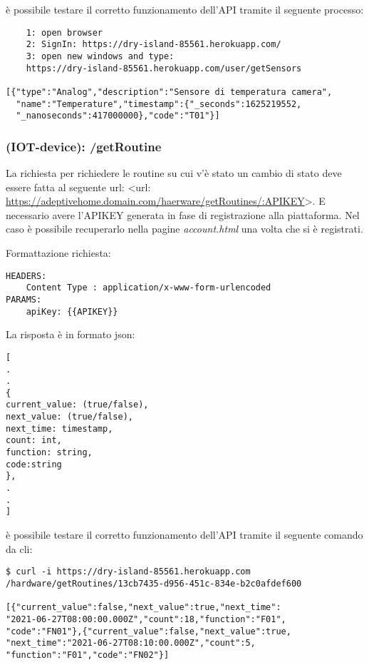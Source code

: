 \documentclass[onecolumn,a4paper]{article}
\begin{document}
è possibile testare il corretto funzionamento dell'API tramite il seguente processo:

\begin{verbatim}
    1: open browser
    2: SignIn: https://dry-island-85561.herokuapp.com/
    3: open new windows and type:
    https://dry-island-85561.herokuapp.com/user/getSensors

[{"type":"Analog","description":"Sensore di temperatura camera",
  "name":"Temperature","timestamp":{"_seconds":1625219552,
  "_nanoseconds":417000000},"code":"T01"}]

\end{verbatim}


\subsubsection{(IOT-device): /getRoutine}
\label{sec:org8ddf33c}

La richiesta per richiedere le routine su cui v'è stato un cambio di stato deve essere fatta al seguente url: <url: \url{https://adeptivehome.domain.com/haerware/getRoutines/:APIKEY}>. E necessario avere l'APIKEY generata in fase di registrazione alla piattaforma. Nel caso è possibile recuperarlo nella pagine \emph{account.html} una volta che si è registrati.

Formattazione richiesta:

\begin{verbatim}
HEADERS:
    Content Type : application/x-www-form-urlencoded
PARAMS:
    apiKey: {{APIKEY}}

\end{verbatim}

La risposta è in formato json: 

\begin{verbatim}
[
.
.
{
current_value: (true/false),
next_value: (true/false),
next_time: timestamp,
count: int,
function: string,
code:string
},
.
.
]
\end{verbatim}

è possibile testare il corretto funzionamento dell'API tramite il seguente comando da cli:
\begin{verbatim}
$ curl -i https://dry-island-85561.herokuapp.com
/hardware/getRoutines/13cb7435-d956-451c-834e-b2c0afdef600

[{"current_value":false,"next_value":true,"next_time":
"2021-06-27T08:00:00.000Z","count":18,"function":"F01",
"code":"FN01"},{"current_value":false,"next_value":true,
"next_time":"2021-06-27T08:10:00.000Z","count":5,
"function":"F01","code":"FN02"}]
\end{verbatim}
\end{document}
